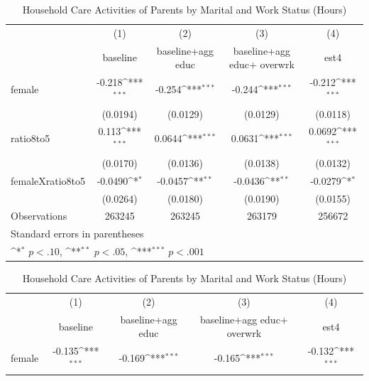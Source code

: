 \begin{table}[htbp]\centering
\footnotesize
\caption{Household Care Activities of Parents by Marital and Work Status (Hours)}\label{table3}
{
\def\sym#1{\ifmmode^{#1}\else\(^{#1}\)\fi}
\begin{tabular}{l*{4}{c}}
\hline\hline
                    &\multicolumn{1}{c}{(1)}&\multicolumn{1}{c}{(2)}&\multicolumn{1}{c}{(3)}&\multicolumn{1}{c}{(4)}\\
                    &\multicolumn{1}{c}{baseline }&\multicolumn{1}{c}{baseline+agg educ}&\multicolumn{1}{c}{baseline+agg educ+ overwrk}&\multicolumn{1}{c}{est4}\\
\hline
female              &      -0.218\sym{***}&      -0.254\sym{***}&      -0.244\sym{***}&      -0.212\sym{***}\\
                    &    (0.0194)         &    (0.0129)         &    (0.0129)         &    (0.0118)         \\
[1em]
ratio8to5           &       0.113\sym{***}&      0.0644\sym{***}&      0.0631\sym{***}&      0.0692\sym{***}\\
                    &    (0.0170)         &    (0.0136)         &    (0.0138)         &    (0.0132)         \\
[1em]
femaleXratio8to5    &     -0.0490\sym{*}  &     -0.0457\sym{**} &     -0.0436\sym{**} &     -0.0279\sym{*}  \\
                    &    (0.0264)         &    (0.0180)         &    (0.0190)         &    (0.0155)         \\
\hline
Observations        &      263245         &      263245         &      263179         &      256672         \\
\hline\hline
\multicolumn{5}{l}{\footnotesize Standard errors in parentheses}\\
\multicolumn{5}{l}{\footnotesize \sym{*} \(p<.10\), \sym{**} \(p<.05\), \sym{***} \(p<.001\)}\\
\end{tabular}
}
{
\def\sym#1{\ifmmode^{#1}\else\(^{#1}\)\fi}
\begin{tabular}{l*{4}{c}}
\hline\hline
                    &\multicolumn{1}{c}{(1)}&\multicolumn{1}{c}{(2)}&\multicolumn{1}{c}{(3)}&\multicolumn{1}{c}{(4)}\\
                    &\multicolumn{1}{c}{baseline }&\multicolumn{1}{c}{baseline+agg educ}&\multicolumn{1}{c}{baseline+agg educ+ overwrk}&\multicolumn{1}{c}{est4}\\
\hline
female              &      -0.135\sym{***}&      -0.169\sym{***}&      -0.165\sym{***}&      -0.132\sym{***}\\

\end{tabular}}
\end{table}
